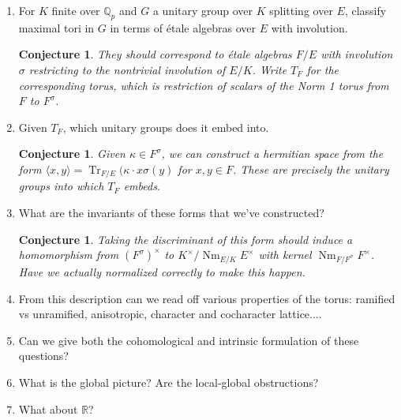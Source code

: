\documentclass{article}
\theoremstyle{plain}
\newtheorem{conjecture}[theorem]{Conjecture}
\theoremstyle{definition}
\DeclareMathOperator{\Nm}{Nm}
\DeclareMathOperator{\Tr}{Tr}
\newcommand{\RR}{\mathbb{R}}
\newcommand{\Qp}{\mathbb{Q}_p}
\newcommand{\la}{\langle}
\newcommand{\ra}{\rangle}
\begin{document}
\begin{enumerate}

\item For $K$ finite over $\Qp$ and $G$ a unitary group over $K$ splitting over $E$, classify maximal tori in $G$ in terms of \'etale algebras over $E$ with involution.

\begin{conjecture}
They should correspond to \'etale algebras $F / E$ with involution $\sigma$ restricting to the nontrivial involution of $E / K$.  Write $T_F$ for the corresponding torus, which is restriction of scalars of the Norm 1 torus from $F$ to $F^\sigma$.
\end{conjecture}
\item Given $T_F$, which unitary groups does it embed into.

\begin{conjecture}
Given $\kappa \in F^\sigma$, we can construct a hermitian space from the form $\la x, y \ra = \Tr_{F/E}(\kappa \cdot x \sigma(y)$ for $x, y \in F$.  These are precisely the unitary groups into which $T_F$ embeds.
\end{conjecture}

\item What are the invariants of these forms that we've constructed?

\begin{conjecture}
Taking the discriminant of this form should induce a homomorphism from $(F^\sigma)^\times$ to $K^\times / \Nm_{E/K} E^\times$ with kernel $\Nm_{F/F^\sigma} F^\times$.  Have we actually normalized correctly to make this happen.
\end{conjecture}

\item From this description can we read off various properties of the torus: ramified vs unramified, anisotropic, character and cocharacter lattice....

\item Can we give both the cohomological and intrinsic formulation of these questions?

\item What is the global picture?  Are the local-global obstructions?

\item What about $\RR$?

\end{enumerate}
\end{document}

